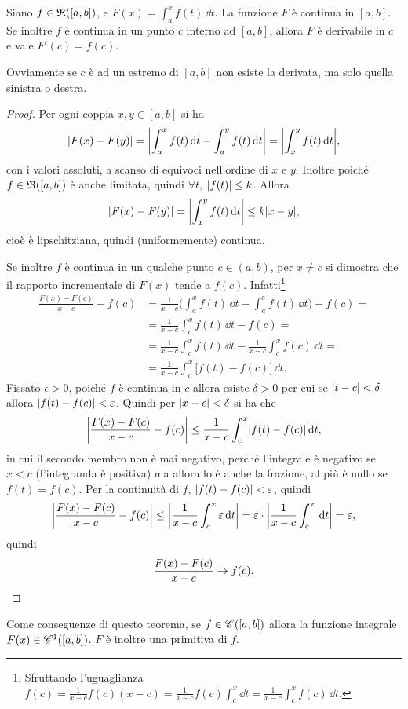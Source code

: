 \begin{teorema} \label{t:tfci1}
Siano $f\in\rie{[a,b]}$, e $F(x)=\int_a^xf(t)\,\dd t$.
La funzione $F$ è continua in $[a,b]$. Se inoltre $f$ è continua in un punto $c$ interno ad $[a,b]$, allora $F$ è derivabile in $c$ e vale $F'(c)=f(c)$.
\end{teorema}
Ovviamente se $c$ è ad un estremo di $[a,b]$ non esiste la derivata, ma solo quella sinistra o destra.
\begin{proof}
Per ogni coppia $x,y\in[a,b]$ si ha
\[
	\abs{F(x)-F(y)}=\abs[\bigg]{\int_a^xf(t)\,\dd t-\int_a^yf(t)\,\dd t}=\abs[\bigg]{\int_x^yf(t)\,\dd t},
\]
con i valori assoluti, a scanso di equivoci nell'ordine di $x$ e $y$. Inoltre poiché $f\in\rie{[a,b]}$ è anche limitata, quindi $\forall t$, $\abs{f(t)}\leq k$. Allora
\[
	\abs{F(x)-F(y)}=\abs[\bigg]{\int_x^yf(t)\,\dd t}\leq k\abs{x-y},
\]
cioè è lipschitziana, quindi (uniformemente) continua.

Se inoltre $f$ è continua in un qualche punto $c\in(a,b)$, per $x\neq c$ si dimostra che il rapporto incrementale di $F(x)$ tende a $f(c)$. Infatti\footnote{Sfruttando l'uguaglianza $f(c)=\frac1{x-c}f(c)(x-c)=\frac1{x-c}f(c)\int_c^x\dd t=\frac1{x-c}\int_c^xf(c)\,\dd t$.}
\[
\begin{split}
\frac{F(x)-F(c)}{x-c}-f(c)
&=\frac1{x-c}\bigg(\int_a^xf(t)\,\dd t-\int_a^cf(t)\,\dd t\bigg)-f(c)=\\
&=\frac1{x-c}\int_c^xf(t)\,\dd t-f(c)=\\
&=\frac1{x-c}\int_c^xf(t)\,\dd t-\frac1{x-c}\int_c^xf(c)\,\dd t=\\
&=\frac1{x-c}\int_c^x\big[f(t)-f(c)\big]\,\dd t.
\end{split}
\]
Fissato $\epsilon>0$, poiché $f$ è continua in $c$ allora esiste $\delta>0$ per cui se $\abs{t-c}<\delta$ allora $\abs{f(t)-f(c)}<\epsilon$. Quindi per $\abs{x-c}<\delta$ si ha che
\[
	\abs[\bigg]{\frac{F(x)-F(c)}{x-c}-f(c)}\leq\frac1{x-c}\int_c^x\abs{f(t)-f(c)}\,\dd t,
\]
in cui il secondo membro non è mai negativo, perché l'integrale è negativo se $x<c$ (l'integranda è positiva) ma allora lo è anche la frazione, al più è nullo se $f(t)=f(c)$.
Per la continuità di $f$, $\abs{f(t)-f(c)}<\epsilon$, quindi
\[
	\abs[\bigg]{\frac{F(x)-F(c)}{x-c}-f(c)}\leq\abs[\bigg]{\frac1{x-c}\int_c^x\epsilon\,\dd t}=\epsilon\cdot\abs[\bigg]{\frac1{x-c}\int_c^x\,\dd t}=\epsilon,
\]
quindi
\[
\frac{F(x)-F(c)}{x-c}\to f(c).\qedhere
\]
\end{proof}
Come conseguenze di questo teorema, se $f\in\cont{[a,b]}$ allora la funzione integrale $F(x)\in\cont[1]{[a,b]}$. $F$ è inoltre una primitiva di $f$.
